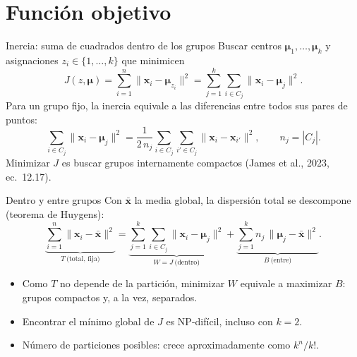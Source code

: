 \documentclass[aspectratio=169,11pt]{beamer}
\newcommand{\x}{\bm{x}}
\newcommand{\muv}{\bm{\mu}}
\begin{document}
\section{Función objetivo}

\begin{frame}{Inercia: suma de cuadrados dentro de los grupos}
  Buscar centros $\muv_1,\dots,\muv_k$ y asignaciones $z_i\in\{1,\dots,k\}$ que minimicen
  \[
    J(z,\muv) = \sum_{i=1}^{n} \lVert \x_i - \muv_{z_i} \rVert^2
      = \sum_{j=1}^{k}\sum_{i\in C_j} \lVert \x_i - \muv_j \rVert^2 .
  \]
  Para un grupo fijo, la inercia equivale a las diferencias entre todos sus pares de puntos:
  \[
    \sum_{i\in C_j}\lVert\x_i-\muv_j\rVert^2 = \frac{1}{2\,n_j}\sum_{i\in C_j}\sum_{i'\in C_j}\lVert\x_i-\x_{i'}\rVert^2 ,
    \qquad n_j = |C_j| .
  \]
  {\small Minimizar $J$ es buscar grupos internamente compactos (James et al., 2023, ec.~12.17).}
\end{frame}

\begin{frame}{Dentro y entre grupos}
  Con $\bar{\x}$ la media global, la dispersión total se descompone (teorema de Huygens):
  \[
    \underbrace{\sum_{i=1}^n\lVert\x_i-\bar{\x}\rVert^2}_{T\ \text{(total, fija)}}
    = \underbrace{\sum_{j=1}^k\sum_{i\in C_j}\lVert\x_i-\muv_j\rVert^2}_{W = J\ \text{(dentro)}}
    + \underbrace{\sum_{j=1}^k n_j\,\lVert\muv_j-\bar{\x}\rVert^2}_{B\ \text{(entre)}} .
  \]
  \begin{itemize}
    \item Como $T$ no depende de la partición, \alert{minimizar $W$ equivale a maximizar $B$}:
          grupos compactos y, a la vez, separados.
    \item Encontrar el mínimo global de $J$ es NP-difícil, incluso con $k=2$.
    \item Número de particiones posibles: crece aproximadamente como $k^n/k!$.
  \end{itemize}
\end{frame}
\end{document}
